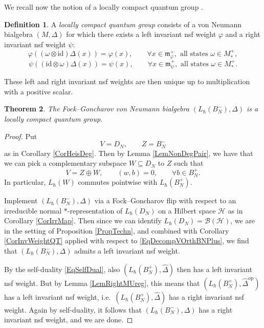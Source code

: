 \documentclass[11pt, reqno]{amsart}
\newtheorem{theorem}{Theorem}[section]
\theoremstyle{definition}
\newtheorem{defn}[theorem]{Definition}
\numberwithin{equation}{section}
\newcommand{\Hsp}{\mathcal{H}}
\newcommand{\Bc}{\mathcal{B}}
\newcommand{\Bor}{B}
\newcommand{\id}{\mathrm{id}}
\newcommand{\opp}{\mathrm{op}}
\newcommand{\mfm}{\mathfrak{m}}
\begin{document}
We recall now the notion of a locally compact quantum group \cite{KV00,KV03}. 

\begin{defn}
A \emph{locally compact quantum group} consists of a von Neumann bialgebra $(M,\Delta)$ for which there exists a left invariant nsf weight $\varphi$ and a right invariant nsf weight $\psi$: 
\begin{equation}\label{EqLeftInvWeight}
\varphi((\omega \otimes \id)\Delta(x)) = \varphi(x),\qquad \forall x \in \mfm_{\varphi}^+, \textrm{ all states }\omega \in M_*^+,
\end{equation}
\begin{equation}\label{EqRightInvWeight}
\psi((\id \otimes \omega)\Delta(x)) = \psi(x),\qquad \forall x \in \mfm_{\psi}^+, \textrm{ all states }\omega \in M_*^+.
\end{equation}
\end{defn}
These left and right invariant nsf weights are then unique up to multiplication with a positive scalar.

\begin{theorem}\label{TheoLCQG}
The Fock--Goncharov von Neumann bialgebra $(L_{\hbar}(\Bor_N^-),\Delta)$ is a locally compact quantum group.
\end{theorem} 
\begin{proof}
Put
\[
V = D_N,\qquad Z = \Bor_N^-
\]
as in Corollary \ref{CorHeisDeg}. Then by Lemma \ref{LemNonDegPair}, we have that we can pick a complementary subspace $W \subseteq D_N$ to $Z$ such that 
\begin{equation}\label{EqDecompVOrthBNPlus}
V = Z\oplus W,\qquad (w,b) = 0,\qquad \forall b\in \Bor_N^+.
\end{equation}
In particular, $L_{\hbar}(W)$ commutes pointwise with $L_{\hbar}(\Bor_N^+)$.

Implement $(L_{\hbar}(\Bor_N^-),\Delta)$ via a Fock--Goncharov flip with respect to an irreducible normal $*$-representation of $L_{\hbar}(D_N)$ on a Hilbert space $\Hsp$ as in Corollary \ref{CorIrrMap}. Then since we can identify $L_{\hbar}(D_N) = \Bc(\Hsp)$, we are in the setting of Proposition \ref{PropTechn}, and combined with Corollary \ref{CorInvWeightQT} applied with respect to \eqref{EqDecompVOrthBNPlus}, we find that $(L_{\hbar}(\Bor_N^-),\Delta)$ admits a left invariant nsf weight.

By  the  self-duality \eqref{EqSelfDual}, also $(L_{\hbar}(\Bor_N^+),\hat{\Delta})$ then has a left invariant nsf weight. But by Lemma \ref{LemRightMUreg}, this means that $(L_{\hbar}(\Bor_N^+),\hat{\Delta}^{\opp})$ has a left invariant nsf weight, i.e.\ $(L_{\hbar}(\Bor_N^+),\hat{\Delta})$ has a right invariant nsf weight. Again by self-duality, it follows that $(L_{\hbar}(\Bor_N^-),\Delta)$ has a right invariant nsf weight, and we are done.
\end{proof}
\end{document}

